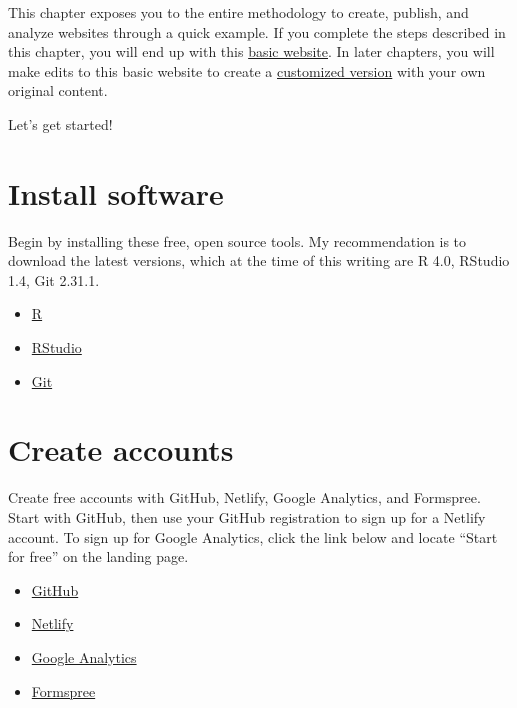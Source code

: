 \documentclass[
]{book}
\providecommand{\tightlist}{%
  \setlength{\itemsep}{0pt}\setlength{\parskip}{0pt}}
\begin{document}
This chapter exposes you to the entire methodology to create, publish, and analyze websites through a quick example. If you complete the steps described in this chapter, you will end up with this \href{https://r4sites-anatole.netlify.app/}{basic website}. In later chapters, you will make edits to this basic website to create a \href{https://r4sites-anatole-custom.netlify.app/}{customized version} with your own original content.

Let's get started!

\hypertarget{install-software}{%
\section{Install software}\label{install-software}}

Begin by installing these free, open source tools. My recommendation is to download the latest versions, which at the time of this writing are R 4.0, RStudio 1.4, Git 2.31.1.

\begin{itemize}
\tightlist
\item
  \href{https://cran.rstudio.com/}{R}
\item
  \href{https://www.rstudio.com/products/rstudio/download/\#download}{RStudio}
\item
  \href{https://git-scm.com/book/en/v2/Getting-Started-Installing-Git}{Git}
\end{itemize}

\hypertarget{create-accounts}{%
\section{Create accounts}\label{create-accounts}}

Create free accounts with GitHub, Netlify, Google Analytics, and Formspree. Start with GitHub, then use your GitHub registration to sign up for a Netlify account. To sign up for Google Analytics, click the link below and locate ``Start for free'' on the landing page.

\begin{itemize}
\tightlist
\item
  \href{https://github.com/}{GitHub}
\item
  \href{https://app.netlify.com/}{Netlify}
\item
  \href{https://marketingplatform.google.com/about/analytics/}{Google Analytics}
\item
  \href{https://formspree.io/register}{Formspree}
\end{itemize}
\end{document}
